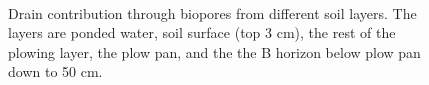 \begin{figure}[htbp]
  \begin{center}
    \\
  \end{center}
  \caption{Drain contribution through biopores from different soil
    layers.  The layers are ponded water, soil surface (top 3 cm), the
    rest of the plowing layer, the plow pan, and the the B horizon
    below plow pan down to 50 cm.}
  \label{fig:Silstrup-biopore-drain}
\end{figure}\FloatBarrier
